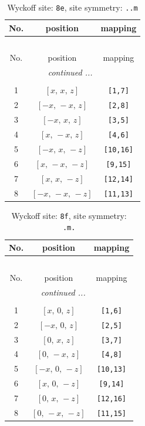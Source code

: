 \documentclass[fleqn,8pt]{jsarticle}
\begin{document}
\begin{longtable}{ccc}
\caption{Wyckoff site: {\tt 8e}, site symmetry: {\tt ..m}}
 \\
 \hline \hline
No. & position & mapping \\ \hline \endfirsthead

\multicolumn{2}{l}{\tablename\ \thetable{}} \\
 \hline \hline
No. & position & mapping \\ \hline \endhead

 \hline \hline
\multicolumn{2}{r}{\footnotesize\it continued ...} \\ \endfoot

 \hline \hline
\multicolumn{2}{r}{} \\ \endlastfoot

1 & $\left[ x,\, x,\, z \right]$ & {\tt [1,7]} \\ \hline
2 & $\left[ - x,\, - x,\, z \right]$ & {\tt [2,8]} \\ \hline
3 & $\left[ - x,\, x,\, z \right]$ & {\tt [3,5]} \\ \hline
4 & $\left[ x,\, - x,\, z \right]$ & {\tt [4,6]} \\ \hline
5 & $\left[ - x,\, x,\, - z \right]$ & {\tt [10,16]} \\ \hline
6 & $\left[ x,\, - x,\, - z \right]$ & {\tt [9,15]} \\ \hline
7 & $\left[ x,\, x,\, - z \right]$ & {\tt [12,14]} \\ \hline
8 & $\left[ - x,\, - x,\, - z \right]$ & {\tt [11,13]} \\
\end{longtable}
\renewcommand{\arraystretch}{1.2}
\begin{longtable}{ccc}
\caption{Wyckoff site: {\tt 8f}, site symmetry: {\tt .m.}}
 \\
 \hline \hline
No. & position & mapping \\ \hline \endfirsthead

\multicolumn{2}{l}{\tablename\ \thetable{}} \\
 \hline \hline
No. & position & mapping \\ \hline \endhead

 \hline \hline
\multicolumn{2}{r}{\footnotesize\it continued ...} \\ \endfoot

 \hline \hline
\multicolumn{2}{r}{} \\ \endlastfoot

1 & $\left[ x,\, 0,\, z \right]$ & {\tt [1,6]} \\ \hline
2 & $\left[ - x,\, 0,\, z \right]$ & {\tt [2,5]} \\ \hline
3 & $\left[ 0,\, x,\, z \right]$ & {\tt [3,7]} \\ \hline
4 & $\left[ 0,\, - x,\, z \right]$ & {\tt [4,8]} \\ \hline
5 & $\left[ - x,\, 0,\, - z \right]$ & {\tt [10,13]} \\ \hline
6 & $\left[ x,\, 0,\, - z \right]$ & {\tt [9,14]} \\ \hline
7 & $\left[ 0,\, x,\, - z \right]$ & {\tt [12,16]} \\ \hline
8 & $\left[ 0,\, - x,\, - z \right]$ & {\tt [11,15]} \\
\end{longtable}
\end{document}
